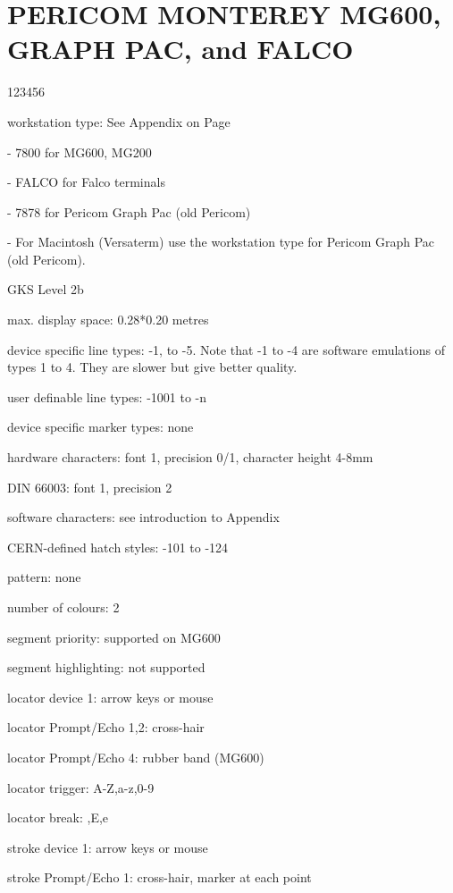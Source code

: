 \section{PERICOM MONTEREY MG600, GRAPH PAC, and FALCO}
\begin{DLtt}{123456}
\item[workstation type:]See Appendix on Page~\pageref{sec:gtstyp}
\item[-]7800 for MG600, MG200
\item[-]FALCO for Falco terminals
\item[-]7878 for Pericom Graph Pac (old Pericom)
\item[-]For Macintosh (Versaterm) use the
workstation type for Pericom Graph Pac (old Pericom).
\item[GKS Level]2b
\item[max. display space:]0.28*0.20 metres
\item[device specific line types:]-1, to -5.
Note that -1 to -4 are software emulations of types 1 to 4.
They are slower but give better quality.
\item[user definable line types:]-1001 to -n
\item[device specific marker types:]none
\item[hardware characters:]font 1, precision 0/1, character height 4-8mm
\item[DIN 66003:]font 1, precision 2
\item[software characters:]see introduction to Appendix
\item[CERN-defined hatch styles:]-101 to -124
\item[pattern:]none
\item[number of colours:]2
\item[segment priority:]supported on MG600
\item[segment highlighting:]not supported
\item[locator device 1:]arrow keys or mouse
\item[locator Prompt/Echo 1,2:]cross-hair
\item[locator Prompt/Echo 4:]rubber band (MG600)
\item[locator trigger:] A-Z,a-z,0-9
\item[locator break:],E,e
\item[stroke device 1:]arrow keys or mouse
\item[stroke Prompt/Echo 1:]cross-hair, marker at each point

\end{DLtt}
